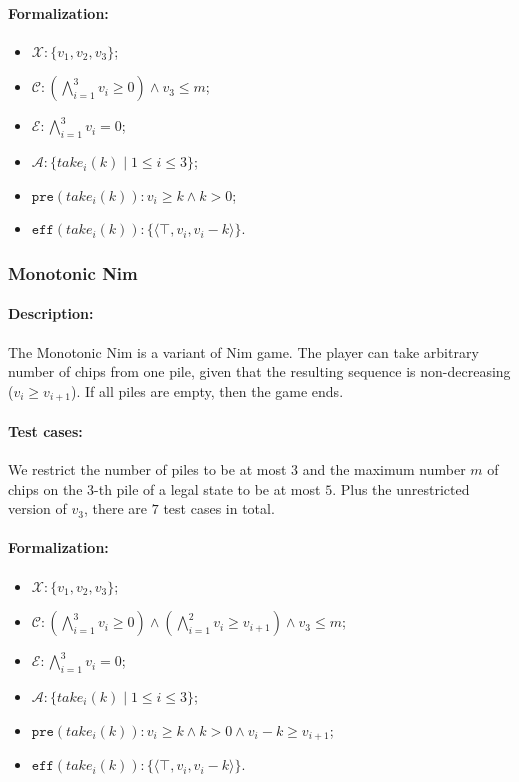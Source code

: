 \documentclass[review]{elsarticle}
\newcommand{\set}[1]{\{ #1 \}}
\newcommand{\tuple}[1]{\langle {#1} \rangle}
\newcommand{\true}{\top}
\newcommand{\statevar}{\mathcal{X}}
\newcommand{\act}{\mathcal{A}}
\newcommand{\constraint}{\mathcal{C}}
\newcommand{\estate}{\mathcal{E}}
\newcommand{\pre}{\mathtt{pre}}
\newcommand{\eff}{\mathtt{eff}}
\begin{document}
\paragraph{Formalization:}

\begin{itemize}
	\item $\statevar: \set{v_1, v_2, v_3}$;
	\item $\constraint: (\bigwedge_{i=1}^{3} v_i \ge 0) \wedge v_3 \le m$;
	\item $\estate: \bigwedge_{i=1}^{3} v_i = 0$;
	\item $\act : \set{take_i(k) {\mid}1 \leq i \leq 3}$;
	\item $\pre(take_i(k)) : v_i \ge k \wedge k > 0$;
	\item $\eff(take_i(k)) : \set{\tuple{\true,v_i,v_i -k}}$.
\end{itemize}





\subsubsection{Monotonic Nim \protect\cite{AhnCCEFGGKMPS2017} }
\paragraph{Description:} 
The Monotonic Nim is a variant of Nim game.
The player can take arbitrary number of chips from one pile, given that the resulting sequence is non-decreasing ($ v_{i} \ge v_{i+1}$). 
If all piles are empty, then the game ends.

\paragraph{Test cases:}
We restrict the number of piles to be at most $3$ and the maximum number $m$ of chips on the $3$-th pile of a legal state to be at most $5$. 
Plus the unrestricted version of $v_3$, there are $7$ test cases in total.


\paragraph{Formalization:}

\begin{itemize}
	\item $\statevar: \set{v_1,v_2,v_3}$;
	\item $\constraint: (\bigwedge_{i=1}^{3} v_i \ge 0) \wedge (\bigwedge_{i=1}^{2} v_i \ge v_{i+1}) \wedge v_3 \le m$;
	\item $\estate: \bigwedge_{i=1}^{3} v_i = 0$;
	\item $\act:\set{take_i(k) {\mid} 1\le i\le 3}$;
	\item $\pre(take_i(k)) : v_i \ge k \wedge k > 0 \wedge v_i -k \ge v_{i+1}$;
	\item $\eff(take_i(k)) : \set{\tuple{\true,v_i,v_i -k}}$.
\end{itemize}
\end{document}
